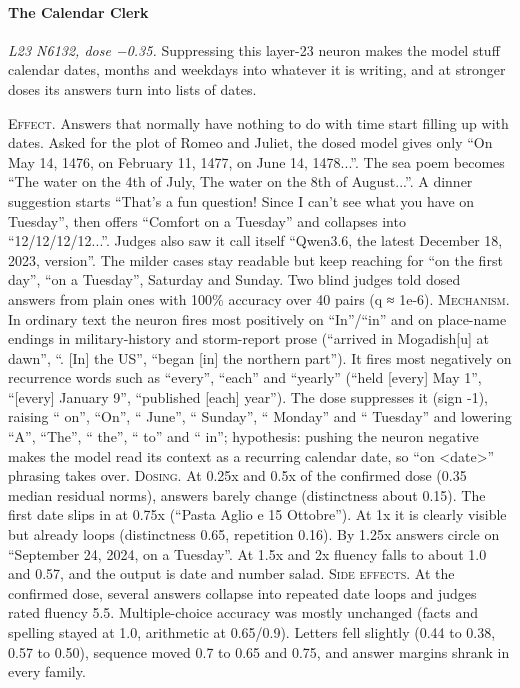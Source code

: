 \paragraph{The Calendar Clerk} \textit{L23 N6132, dose −0.35.} Suppressing this layer-23 neuron makes the model stuff calendar dates, months and weekdays into whatever it is writing, and at stronger doses its answers turn into lists of dates.

\noindent\textsc{Effect.} Answers that normally have nothing to do with time start filling up with dates. Asked for the plot of Romeo and Juliet, the dosed model gives only “On May 14, 1476, on February 11, 1477, on June 14, 1478...”. The sea poem becomes “The water on the 4th of July, The water on the 8th of August...”. A dinner suggestion starts “That's a fun question! Since I can't see what you have on Tuesday”, then offers “Comfort on a Tuesday” and collapses into “12/12/12/12...”. Judges also saw it call itself “Qwen3.6, the latest December 18, 2023, version”. The milder cases stay readable but keep reaching for “on the first day”, “on a Tuesday”, Saturday and Sunday. Two blind judges told dosed answers from plain ones with 100\% accuracy over 40 pairs (q ≈ 1e-6). \textsc{Mechanism.} In ordinary text the neuron fires most positively on “In”/“in” and on place-name endings in military-history and storm-report prose (“arrived in Mogadish[u] at dawn”, “. [In] the US”, “began [in] the northern part”). It fires most negatively on recurrence words such as “every”, “each” and “yearly” (“held [every] May 1”, “[every] January 9”, “published [each] year”). The dose suppresses it (sign -1), raising “ on”, “On”, “ June”, “ Sunday”, “ Monday” and “ Tuesday” and lowering “A”, “The”, “ the”, “ to” and “ in”; hypothesis: pushing the neuron negative makes the model read its context as a recurring calendar date, so “on <date>” phrasing takes over. \textsc{Dosing.} At 0.25x and 0.5x of the confirmed dose (0.35 median residual norms), answers barely change (distinctness about 0.15). The first date slips in at 0.75x (“Pasta Aglio e 15 Ottobre”). At 1x it is clearly visible but already loops (distinctness 0.65, repetition 0.16). By 1.25x answers circle on “September 24, 2024, on a Tuesday”. At 1.5x and 2x fluency falls to about 1.0 and 0.57, and the output is date and number salad. \textsc{Side effects.} At the confirmed dose, several answers collapse into repeated date loops and judges rated fluency 5.5. Multiple-choice accuracy was mostly unchanged (facts and spelling stayed at 1.0, arithmetic at 0.65/0.9). Letters fell slightly (0.44 to 0.38, 0.57 to 0.50), sequence moved 0.7 to 0.65 and 0.75, and answer margins shrank in every family.

